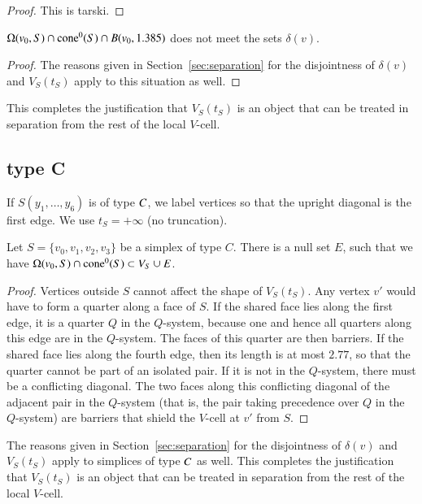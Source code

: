 \begin{proof} This is tarski.
\end{proof}

\begin{lemma} $\Omega(v_0,S) \cap {\operatorname{cone}}^0(S) \cap B(v_0,1.385)$
does not meet the sets $\delta(v)$.
\end{lemma}

\begin{proof}
The reasons given in Section~\ref{sec:separation} for the
disjointness of $\delta(v)$ and $V_S(t_S)$ apply to this
situation as well.
\end{proof}


This completes the justification that
$V_S(t_S)$ is an object that can be treated in separation from the
rest of the local $V$-cell.

\subsection{type C}%

If $S(y_1,\ldots,y_6)$ is of type $C$, we label vertices so that
the upright diagonal is the first edge.  We use $t_S =+\infty$ (no
truncation).   

\begin{lemma} Let $S=\{v_0,v_1,v_2,v_3\}$ be a simplex of type $C$.
There is a null set $E$, such that
we have  $ \Omega(v_0,S) \cap {\operatorname{cone}}^0(S) \subset V_S \cup E$.
\end{lemma}

\begin{proof}  %
Vertices outside $S$ cannot affect the shape of $V_S(t_S)$.  Any
vertex $v'$ would have to form a quarter along a face of $S$.  If
the shared face lies along the first edge, it is a quarter $Q$ in
the $Q$-system, because one and hence all quarters along this edge
are in the $Q$-system.  The faces of this quarter are then
barriers. If the shared face lies along the fourth edge, then its
length is at most $2.77$, so that the quarter cannot be part of an
isolated pair. If it is not in the $Q$-system, there must be a
conflicting diagonal. The two faces along this conflicting
diagonal of the adjacent pair in the $Q$-system (that is, the pair
taking precedence over $Q$ in the $Q$-system) are barriers that
shield the $V$-cell at $v'$ from $S$.
\end{proof}

The reasons given in Section~\ref{sec:separation} for the
disjointness of $\delta(v)$ and $V_S(t_S)$ apply to simplices of
type $C$ as well. This completes the justification that
$V_S(t_S)$ is an object that can be treated in separation from the
rest of the local $V$-cell.


